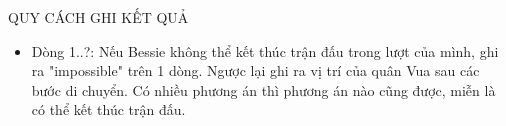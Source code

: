 QUY CÁCH GHI KẾT QUẢ
\begin{itemize}
	\item     Dòng 1..?: Nếu Bessie không thể kết thúc trận đấu trong lượt của mình, ghi ra         "impossible" trên 1 dòng. Ngược lại ghi ra vị trí của quân Vua sau các bước         di chuyển. Có nhiều phương án thì phương án nào cũng được, miễn là          có thể kết thúc trận đấu.   
\end{itemize}